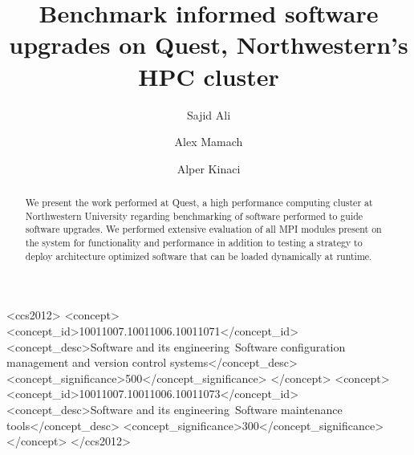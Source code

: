 \documentclass[manuscript,screen]{acmart}
\begin{document}
\title{Benchmark informed software upgrades on Quest, Northwestern's HPC cluster}

\author{Sajid Ali}

\author{Alex Mamach}


\author{Alper Kinaci}


\begin{abstract}
  We present the work performed at Quest, a high performance computing cluster at Northwestern University regarding benchmarking of software performed to guide software upgrades. We performed extensive evaluation of all MPI modules present on the system for functionality and performance in addition to testing a strategy to deploy architecture optimized software that can be loaded dynamically at runtime.
\end{abstract}

\begin{CCSXML}
	<ccs2012>
	<concept>
	<concept_id>10011007.10011006.10011071</concept_id>
	<concept_desc>Software and its engineering~Software configuration management and version control systems</concept_desc>
	<concept_significance>500</concept_significance>
	</concept>
	<concept>
	<concept_id>10011007.10011006.10011073</concept_id>
	<concept_desc>Software and its engineering~Software maintenance tools</concept_desc>
	<concept_significance>300</concept_significance>
	</concept>
	</ccs2012>
\end{CCSXML}
\end{document}
